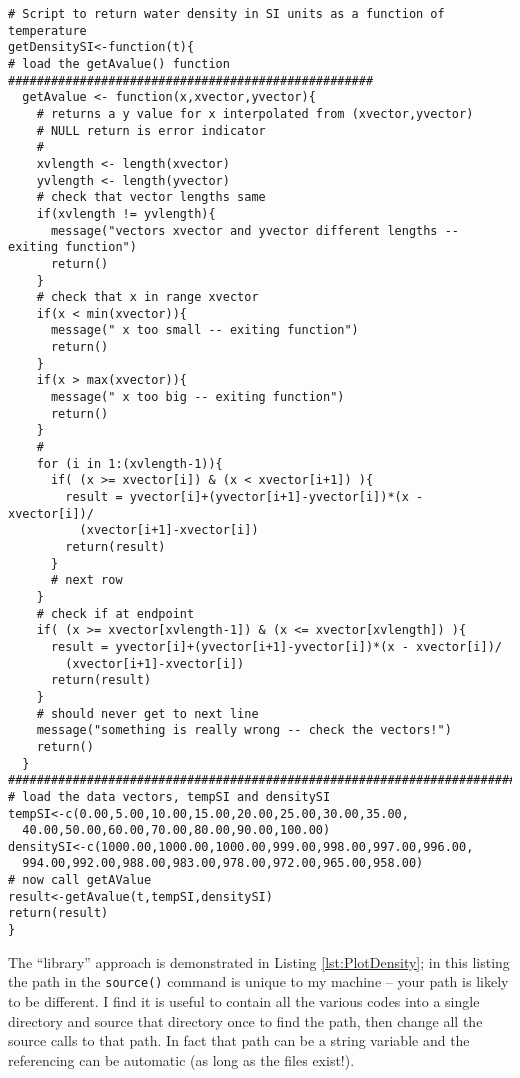 \begin{lstlisting}[caption=R code to Return Water Density for Given Temperature, label=lst:getDensitySI]
# Script to return water density in SI units as a function of temperature
getDensitySI<-function(t){
# load the getAvalue() function ###################################################
  getAvalue <- function(x,xvector,yvector){
    # returns a y value for x interpolated from (xvector,yvector)
    # NULL return is error indicator
    #
    xvlength <- length(xvector)
    yvlength <- length(yvector)
    # check that vector lengths same
    if(xvlength != yvlength){
      message("vectors xvector and yvector different lengths -- exiting function")
      return()
    }
    # check that x in range xvector
    if(x < min(xvector)){
      message(" x too small -- exiting function")
      return()
    }
    if(x > max(xvector)){
      message(" x too big -- exiting function")
      return()
    }
    #
    for (i in 1:(xvlength-1)){
      if( (x >= xvector[i]) & (x < xvector[i+1]) ){
        result = yvector[i]+(yvector[i+1]-yvector[i])*(x - xvector[i])/
          (xvector[i+1]-xvector[i])
        return(result)
      }
      # next row  
    }
    # check if at endpoint
    if( (x >= xvector[xvlength-1]) & (x <= xvector[xvlength]) ){
      result = yvector[i]+(yvector[i+1]-yvector[i])*(x - xvector[i])/
        (xvector[i+1]-xvector[i])
      return(result)
    }
    # should never get to next line
    message("something is really wrong -- check the vectors!")
    return()
  }
#########################################################################################
# load the data vectors, tempSI and densitySI
tempSI<-c(0.00,5.00,10.00,15.00,20.00,25.00,30.00,35.00,
  40.00,50.00,60.00,70.00,80.00,90.00,100.00)
densitySI<-c(1000.00,1000.00,1000.00,999.00,998.00,997.00,996.00,
  994.00,992.00,988.00,983.00,978.00,972.00,965.00,958.00)
# now call getAValue
result<-getAvalue(t,tempSI,densitySI)
return(result)
}
  \end{lstlisting}  

The ``library'' approach is demonstrated in Listing \ref{lst:PlotDensity}; in this listing the path in the \texttt{source()} command is unique to my machine -- your path is likely to be different.  I find it is useful to contain all the various codes into a single directory and source that directory once to find the path, then change all the source calls to that path.  In fact that path can be a string variable and the referencing can be automatic (as long as the files exist!).

